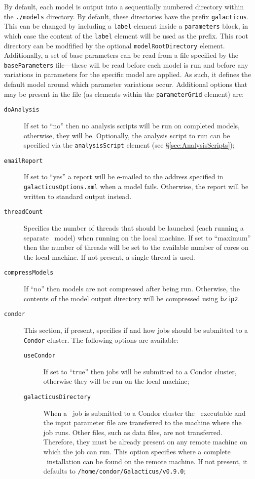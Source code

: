 By default, each model is output into a sequentially numbered directory within the {\tt ./models} directory. By default, these directories have the prefix {\tt galacticus}. This can be changed by including a {\tt label} element inside a {\tt parameters} block, in which case the content of the {\tt label} element will be used as the prefix. This root directory can be modfified by the optional {\tt modelRootDirectory} element. Additionally, a set of base parameters can be read from a file specified by the {\tt baseParameters} file---these will be read before each model is run and before any variations in parameters for the specific model are applied. As such, it defines the default model around which parameter variations occur. Additional options that may be present in the file (as elements within the {\tt parameterGrid} element) are:
\begin{description}
\item[{\tt doAnalysis}]If set to ``no'' then no analysis scripts will be run on completed models, otherwise, they will be. Optionally, the analysis script to run can be specified via the {\tt analysisScript} element (see \S\ref{sec:AnalysisScripts});
\item[{\tt emailReport}] If set to ``yes'' a report will be e-mailed to the address specified in {\tt galacticusOptions.xml} when a model fails. Otherwise, the report will be written to standard output instead.
\item[{\tt threadCount}] Specifies the number of threads that should be launched (each running a separate \glc\ model) when running on the local machine. If set to ``maximum'' then the number of threads will be set to the available number of cores on the local machine. If not present, a single thread is used.
\item[{\tt compressModels}] If ``no'' then models are not compressed after being run. Otherwise, the contents of the model output directory will be compressed using {\tt bzip2}.
\item[{\tt condor}] This section, if present, specifies if and how jobs should be submitted to a {\tt Condor} cluster. The following options are available:
\begin{description}
\item[{\tt useCondor}] If set to ``true'' then jobs will be submitted to a {\sc Condor} cluster, otherwise they will be run on the local machine;
\item[{\tt galacticusDirectory}] When a \glc\ job is submitted to a {\sc Condor} cluster the \glc\ executable and the input parameter file are transferred to the machine where the job runs. Other files, such as data files, are not transferred. Therefore, they must be already present on any remote machine on which the job can run. This option specifies where a complete \glc\ installation can be found on the remote machine. If not present, it defaults to {\tt /home/condor/Galacticus/v0.9.0};

\end{description}
\end{description}
